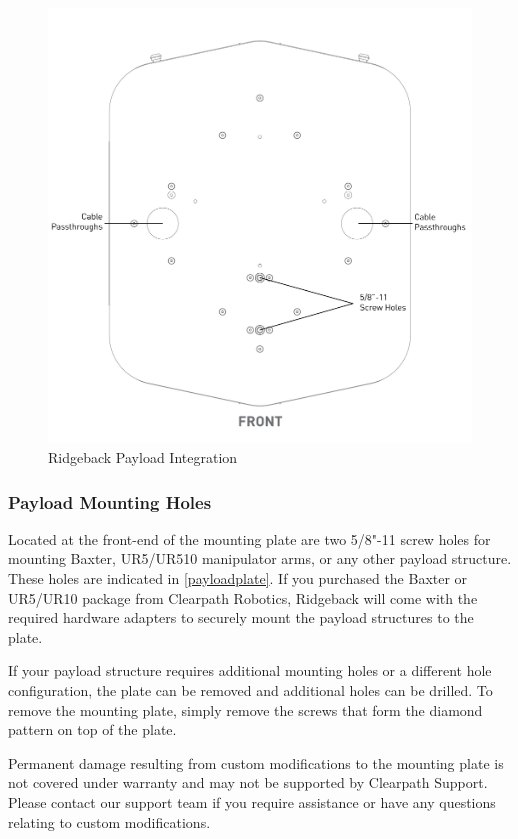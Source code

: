 \documentclass[]{clearpath-latex/clearpath-manual}
\begin{document}
\begin{figure}[!hbt]
  \centering
  \includegraphics[width=0.75\linewidth]{Payload_Integration_Plate.pdf}
  \caption{Ridgeback Payload Integration}
  \label{payloadplate}
\end{figure}

\subsubsection{Payload Mounting Holes}

Located at the front-end of the mounting plate are two 5/8"-11 screw holes for mounting Baxter, UR5/UR510 manipulator arms, or any other payload structure.  These holes are indicated in \autoref{payloadplate}. If you purchased the Baxter or UR5/UR10 package from Clearpath Robotics, Ridgeback will come with the required hardware adapters to securely mount the payload structures to the plate.

If your payload structure requires additional mounting holes or a different hole configuration, the plate can be removed and additional holes can be drilled.  To remove the mounting plate, simply remove the screws that form the diamond pattern on top of the plate.

\begin{warning}[]
Permanent damage resulting from custom modifications to the mounting plate is not covered under warranty and may not be supported by Clearpath Support.  Please contact our support team if you require assistance or have any questions relating to custom modifications.
\end{warning}
\end{document}
